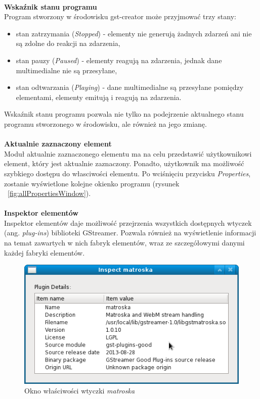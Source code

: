 \documentclass[12pt]{article}
\begin{document}
\paragraph{}\vspace{-3mm}
\textbf{Wskaźnik stanu programu} \\
Program stworzony w środowisku gst-creator może przyjmować trzy stany:
\begin{itemize}
\item stan zatrzymania (\textit{Stopped}) - elementy nie generują żadnych zdarzeń ani nie są zdolne do reakcji na zdarzenia,
\item stan pauzy (\textit{Paused}) - elementy reagują na zdarzenia, jednak dane multimedialne nie są przesyłane,
\item stan odtwarzania (\textit{Playing}) - dane multimedialne są przesyłane pomiędzy elementami, elementy emitują i reagują na zdarzenia.
\end{itemize}
Wskaźnik stanu programu pozwala nie tylko na podejrzenie aktualnego stanu programu stworzonego w środowisku, ale również na jego zmianę. \paragraph{}\vspace{-3mm}
\textbf{Aktualnie zaznaczony element} \\
Moduł aktualnie zaznaczonego elementu ma na celu przedstawić użytkownikowi element, który jest aktualnie zaznaczony. Ponadto, użytkownik ma możliwość szybkiego dostępu do własciwości elementu. Po wciśnięciu przycisku \textit{Properties}, zostanie wyświetlone kolejne okienko programu (rysunek ~\ref{fig:allPropertiesWindow}). \paragraph{}\vspace{-3mm}
\textbf{Inspektor elementów} \\
Inspektor elementów daje możliwość przejrzenia wszystkich dostępnych wtyczek (ang. \textit{plug-ins}) biblioteki GStreamer. Pozwala również na wyświetlenie informacji na temat zawartych w nich fabryk elementów, wraz ze szczegółowymi danymi każdej fabryki elementów. 
\begin{figure}[H]
  \includegraphics[width=12cm]{img/matroska-inspect-window.png}
  \caption{Okno właściwości wtyczki \textit{matroska}}
  \label{fig:matroskaInspectWindow}
\end{figure}
\end{document}
